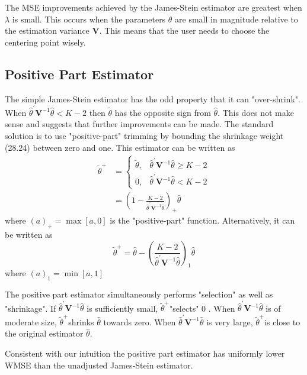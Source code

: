 \documentclass[10pt]{article}
\begin{document}
The MSE improvements achieved by the James-Stein estimator are greatest when $\lambda$ is small. This occurs when the parameters $\theta$ are small in magnitude relative to the estimation variance $\boldsymbol{V}$. This means that the user needs to choose the centering point wisely.

\subsection{Positive Part Estimator}
The simple James-Stein estimator has the odd property that it can "over-shrink". When $\widehat{\theta}^{\prime} \boldsymbol{V}^{-1} \widehat{\theta}<K-2$ then $\widetilde{\theta}$ has the opposite sign from $\widehat{\theta}$. This does not make sense and suggests that further improvements can be made. The standard solution is to use "positive-part" trimming by bounding the shrinkage weight (28.24) between zero and one. This estimator can be written as
$$
\begin{aligned}
\widetilde{\theta}^{+} &=\left\{\begin{array}{cc}
\widetilde{\theta}, & \widehat{\theta}^{\prime} \boldsymbol{V}^{-1} \widehat{\theta} \geq K-2 \\
0, & \widehat{\theta}^{\prime} \boldsymbol{V}^{-1} \widehat{\theta}<K-2
\end{array}\right.\\
&=\left(1-\frac{K-2}{\hat{\theta}^{\prime} \boldsymbol{V}^{-1} \widehat{\theta}}\right)_{+} \widehat{\theta}
\end{aligned}
$$
where $(a)_{+}=\max [a, 0]$ is the "positive-part" function. Alternatively, it can be written as
$$
\widetilde{\theta}^{+}=\widehat{\theta}-\left(\frac{K-2}{\widehat{\theta}^{\prime} \boldsymbol{V}^{-1} \widehat{\theta}}\right)_{1} \widehat{\theta}
$$
where $(a)_{1}=\min [a, 1]$

The positive part estimator simultaneously performs "selection" as well as "shrinkage". If $\widehat{\theta}^{\prime} \boldsymbol{V}^{-1} \widehat{\theta}$ is sufficiently small, $\widetilde{\theta}^{+}$"selects" 0 . When $\widehat{\theta}^{\prime} \boldsymbol{V}^{-1} \widehat{\theta}$ is of moderate size, $\widetilde{\theta}^{+}$shrinks $\widehat{\theta}$ towards zero. When $\widehat{\theta}^{\prime} \boldsymbol{V}^{-1} \widehat{\theta}$ is very large, $\widetilde{\theta}^{+}$is close to the original estimator $\widehat{\theta}$.

Consistent with our intuition the positive part estimator has uniformly lower WMSE than the unadjusted James-Stein estimator.
\end{document}
